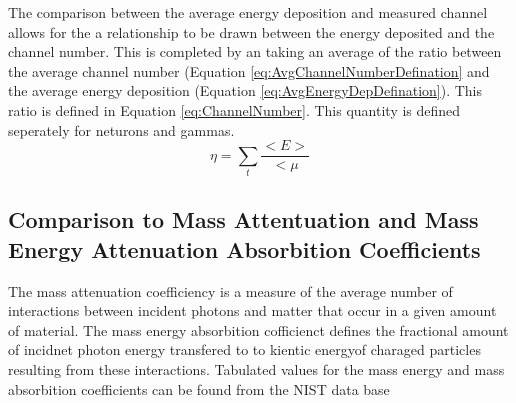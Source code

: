 The comparison between the average energy deposition and measured channel allows for the a relationship to be drawn between the energy deposited and the channel number.
This is completed by an taking an average of the ratio between the average channel number (Equation \ref{eq:AvgChannelNumberDefination} and the average energy deposition (Equation \ref{eq:AvgEnergyDepDefination}).
This ratio is defined in Equation \ref{eq:ChannelNumber}.  This quantity is defined seperately for neturons and gammas.
\begin{equation}
\label{eq:ChannelNumber}
\eta = \sum_t { \frac{<E>}{<\mu}} 
\end{equation}

\subsection{Comparison to Mass Attentuation and Mass Energy Attenuation Absorbition Coefficients}
The mass attenuation coefficiency is a measure of the average number of interactions between incident photons and matter that occur in a given amount of material.
The mass energy absorbition cofficienct defines the fractional amount of incidnet photon energy transfered to to kientic energyof charaged particles resulting from these interactions.
Tabulated values for the mass energy and mass absorbition coefficients can be found from the NIST data base
